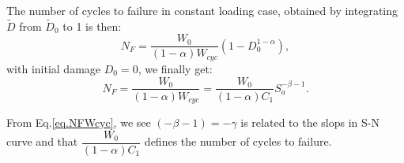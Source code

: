 \documentclass[3p,times,number,review]{elsarticle}
\begin{document}
The number of cycles to failure in constant loading case, obtained by integrating $\tilde{D}$ from $\tilde{D}_0$ to 1 is then:
$$N_F=\dfrac{W_0}{\left( 1-\alpha\right)W_{cyc} }\left( 1-D_0^{1-\alpha}\right) ,$$
with initial damage $D_0=0$, we finally get:
\begin{equation}
N_F=\dfrac{W_0}{\left( 1-\alpha\right)W_{cyc} }=\dfrac{W_0}{(1-\alpha)C_1}S_{a}^{-\beta-1}.
\label{eq.NFWcyc}
\end{equation}

From Eq.\eqref{eq.NFWcyc}, we see $(-\beta-1)=-\gamma$ is related to the slops in S-N curve and that $\dfrac{W_0}{(1-\alpha)C_1}$ defines the number of cycles to failure.

% 
%
%
%
\end{document}
